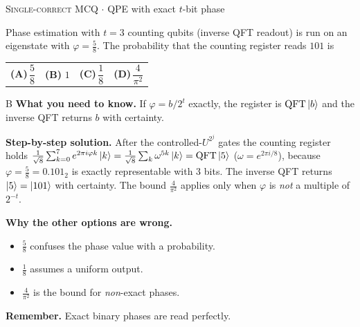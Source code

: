 \documentclass[11pt,a4paper]{article}
\newcommand{\optlabel}[1]{\textbf{(#1)}}
\newcommand{\correctlabel}[1]{\textcolor{okgreen}{\textbf{(#1)}\,\ding{51}}}
\newenvironment{qitem}[1]{\begin{list}{}{\setlength{\leftmargin}{3.3em}\setlength{\labelwidth}{3.1em}%
  \setlength{\labelsep}{0.2em}\setlength{\topsep}{3pt}\setlength{\parsep}{3pt}}\item[\textbf{Q.#1}\hfill]}{\end{list}}
\newcommand{\qsep}{\par\vspace{2pt}{\color{black!15}\hrule}\vspace{4pt}}
\newcommand{\qmeta}[2]{{\footnotesize\color{black!60}\textsc{#1} \;$\cdot$\; #2}\par}
\newcommand{\QFTop}{\mathrm{QFT}}
\begin{document}
\begin{qitem}{65}
\qmeta{Single-correct MCQ}{QPE with exact $t$-bit phase}
Phase estimation with $t = 3$ counting qubits (inverse QFT readout) is run on an eigenstate with $\varphi = \frac58$.
The probability that the counting register reads $101$ is
\par\smallskip\noindent\begin{tabularx}{\linewidth}{@{}*{4}{L}@{}}
\optlabel{A}\,$\dfrac58$ & \correctlabel{B}\,$1$ & \optlabel{C}\,$\dfrac18$ & \optlabel{D}\,$\dfrac{4}{\pi^2}$
\end{tabularx}
\end{qitem}
\begin{solbox}{B}
\textbf{\color{brand}What you need to know.} If $\varphi = b/2^t$ exactly, the register is $\QFTop\ket b$ and the inverse QFT returns $b$ with certainty.

\textbf{\color{brand}Step-by-step solution.} After the controlled-$U^{2^j}$ gates the counting register holds
$\frac{1}{\sqrt8}\sum_{k=0}^{7}e^{2\pi i\varphi k}\ket{k} = \frac{1}{\sqrt8}\sum_k\omega^{5k}\ket k = \mathrm{QFT}\ket{5}$ ($\omega = e^{2\pi i/8}$),
because $\varphi = \frac58 = 0.101_2$ is exactly representable with 3 bits. The inverse QFT returns $\ket{5} = \ket{101}$ with
certainty. The bound $\frac{4}{\pi^2}$ applies only when $\varphi$ is \emph{not} a multiple of $2^{-t}$.

\textbf{\color{brand}Why the other options are wrong.}
\begin{itemize}[leftmargin=2.4em, itemsep=1pt, topsep=2pt]
\item[\textbf{(A)}] $\frac58$ confuses the phase value with a probability.
\item[\textbf{(C)}] $\frac18$ assumes a uniform output.
\item[\textbf{(D)}] $\frac{4}{\pi^2}$ is the bound for \emph{non}-exact phases.
\end{itemize}
\textbf{\color{brand}Remember.} Exact binary phases are read perfectly.
\end{solbox}
\qsep
\end{document}
